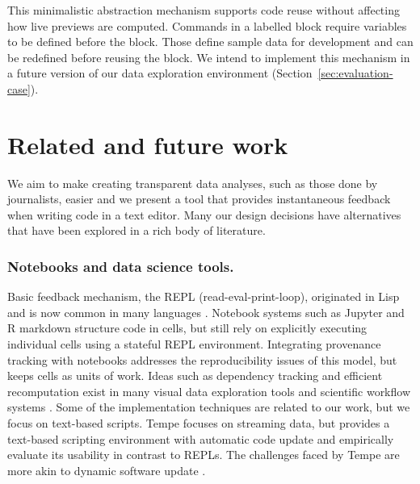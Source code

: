 \documentclass[acmsmall,anonymous,fleqn]{acmart}\settopmatter{printfolios=false,printccs=false,printacmref=false}
\theoremstyle{plain}
\theoremstyle{definition}
\begin{document}
This minimalistic abstraction mechanism supports code reuse without affecting how live previews
are computed. Commands in a labelled block require variables to be defined before the block.
Those define sample data for development and can be redefined before reusing the block. We
intend to implement this mechanism in a future version of our data
exploration environment (Section~\ref{sec:evaluation-case}).


\section{Related and future work}
\label{sec:future}

We aim to make creating transparent data analyses, such as those done by journalists, easier and we
present a tool that provides instantaneous feedback when writing code in a text editor. Many our
design decisions have alternatives that have been explored in a rich body of literature.

\subsubsection*{Notebooks and data science tools.}
Basic feedback mechanism, the REPL (read-eval-print-loop), originated in Lisp
\cite{lisp} and is now common in many languages \cite{drscheme}. Notebook systems
such as Jupyter and R markdown \cite{rmarkdown,jupyter,ipython} structure code in cells,
but still rely on explicitly executing individual cells using a stateful REPL environment.
Integrating provenance tracking with notebooks \cite{dataflow,noworkflow,wrattler} addresses
the reproducibility issues of this model, but keeps cells as units of work. Ideas such as
dependency tracking and efficient recomputation exist in many visual data exploration tools
\cite{control,tableau,vizdom} and scientific workflow systems \cite{taverna,kepler}. Some of the
implementation techniques are related to our work, but we focus on text-based scripts.
Tempe \cite{tempe} focuses on streaming data, but provides a text-based scripting environment
with automatic code update and \citet{ripple} empirically evaluate its usability in contrast to
REPLs. The challenges faced by Tempe are more akin to dynamic software update \cite{dsu}.
\end{document}

